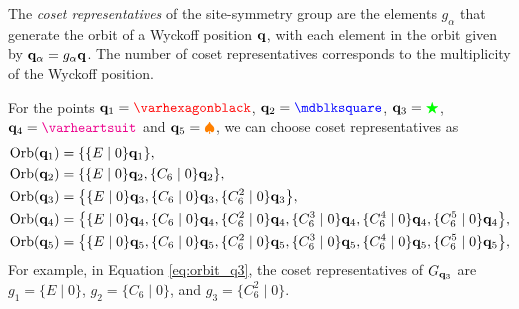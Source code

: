 \begin{definition} \label{def:cosetrep_wyckoff}
The \textit{coset representatives} of the site-symmetry group are the elements \( g_\alpha \) that generate the orbit of a Wyckoff position \( {\vb{q}} \), with each element in the orbit given by \( {\vb{q}}_\alpha = g_\alpha {\vb{q}} \). The number of coset representatives corresponds to the multiplicity of the Wyckoff position.
\end{definition}

\begin{example} \label{ex:coset_representatives_q1q2q3q4q5}
For the points $\q_1 = \textcolor{red}{\varhexagonblack}$, $\q_2 = \textcolor{blue}{\mdblksquare}$, ${\vb{q}}_3 = \textcolor{green}{\bigstar}$, $\q_4 = \textcolor{magenta}{\varheartsuit}$ and ${\vb{q}}_5 = \textcolor{orange}{\spadesuit}$, we can choose coset representatives as
\begin{align}
\text{Orb}({\vb{q}}_1) &= \qty{\{E\mid 0\} {\vb{q}}_1}, \label{eq:orbit_q1} \\
\text{Orb}({\vb{q}}_2) &= \qty{\{E\mid 0\} {\vb{q}}_2, \{C_6\mid 0\} {\vb{q}}_2}, \label{eq:orbit_q2} \\
\text{Orb}({\vb{q}}_3) &= \qty{\{E\mid 0\} {\vb{q}}_3, \{C_6\mid 0\} {\vb{q}}_3, \{C_6^2\mid 0\} {\vb{q}}_3}, \label{eq:orbit_q3} \\
\text{Orb}({\vb{q}}_4) &= \qty{\{E\mid 0\} {\vb{q}}_4, \{C_6\mid 0\} {\vb{q}}_4, \{C_6^2\mid 0\} {\vb{q}}_4, \{C_6^3\mid 0\} {\vb{q}}_4, \{C_6^4\mid 0\} {\vb{q}}_4, \{C_6^5\mid 0\} {\vb{q}}_4}, \label{eq:orbit_q4} \\
\text{Orb}({\vb{q}}_5) &= \qty{\{E\mid 0\} {\vb{q}}_5, \{C_6\mid 0\} {\vb{q}}_5, \{C_6^2\mid 0\} {\vb{q}}_5, \{C_6^3\mid 0\} {\vb{q}}_5, \{C_6^4\mid 0\} {\vb{q}}_5, \{C_6^5\mid 0\} {\vb{q}}_5}, \label{eq:orbit_q5}
\end{align}
For example, in Equation \ref{eq:orbit_q3}, the coset representatives of $G_{{\vb{q}}_3}$ are $g_1 = \{E\mid 0\}$, $g_2 = \{C_6\mid 0\}$, and $g_3 = \{C_6^2\mid 0\}$.
\end{example}

